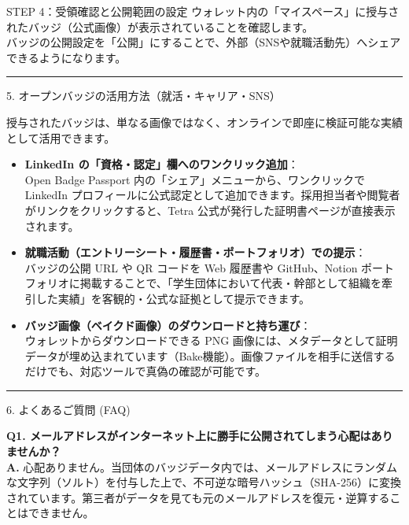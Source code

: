 \documentclass[10.5pt,a4paper]{ltjsarticle}
\newcommand{\mysection}[1]{%
    \vspace{2mm}%
    {\fontsize{12pt}{14pt}\selectfont\bfseries\color{TetraDarkBlue}%
    \rule[-2pt]{3pt}{12pt}\hspace{5pt}#1}%
    \vspace{1.5mm}%
}
\begin{document}
\vspace{1.5mm}

\begin{stepcard}{STEP 4：受領確認と公開範囲の設定}
    ウォレット内の「マイスペース」に授与されたバッジ（公式画像）が表示されていることを確認します。\\
    バッジの公開設定を「公開」にすることで、外部（SNSや就職活動先）へシェアできるようになります。
\end{stepcard}

\newpage


\mysection{5. オープンバッジの活用方法（就活・キャリア・SNS）}

授与されたバッジは、単なる画像ではなく、オンラインで即座に検証可能な実績として活用できます。

\begin{itemize}[leftmargin=14pt, itemsep=4pt]
    \item \textbf{LinkedIn の「資格・認定」欄へのワンクリック追加}：\\
    Open Badge Passport 内の「シェア」メニューから、ワンクリックで LinkedIn プロフィールに公式認定として追加できます。採用担当者や閲覧者がリンクをクリックすると、Tetra 公式が発行した証明書ページが直接表示されます。
    \item \textbf{就職活動（エントリーシート・履歴書・ポートフォリオ）での提示}：\\
    バッジの公開 URL や QR コードを Web 履歴書や GitHub、Notion ポートフォリオに掲載することで、「学生団体において代表・幹部として組織を牽引した実績」を客観的・公式な証拠として提示できます。
    \item \textbf{バッジ画像（ベイクド画像）のダウンロードと持ち運び}：\\
    ウォレットからダウンロードできる PNG 画像には、メタデータとして証明データが埋め込まれています（Bake機能）。画像ファイルを相手に送信するだけでも、対応ツールで真偽の確認が可能です。
\end{itemize}

\mysection{6. よくあるご質問 (FAQ)}

\textbf{Q1. メールアドレスがインターネット上に勝手に公開されてしまう心配はありませんか？} \\
\textbf{A.} 心配ありません。当団体のバッジデータ内では、メールアドレスにランダムな文字列（ソルト）を付与した上で、不可逆な暗号ハッシュ（SHA-256）に変換されています。第三者がデータを見ても元のメールアドレスを復元・逆算することはできません。
\end{document}
